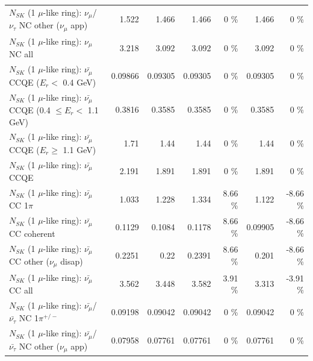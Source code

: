 \begin{table}
\begin{tabular}{| l | r | r | r  r | r  r |}
     $N_{SK}$ (1 $\mu$-like ring): $\nu_\mu$/$\nu_\tau$ NC other ($\nu_\mu$ app) &           1.522 &           1.466 &           1.466 &        0 \%  &           1.466 &        0 \%  \\ 
                                $N_{SK}$ (1 $\mu$-like ring): $\nu_{\mu}$ NC all &           3.218 &           3.092 &           3.092 &        0 \%  &           3.092 &        0 \%  \\ 
\hline
\hline
\hline
          $N_{SK}$ (1 $\mu$-like ring): $\bar{\nu_\mu}$ CCQE ($E_{r} <$ 0.4 GeV) &         0.09866 &         0.09305 &         0.09305 &        0 \%  &         0.09305 &        0 \%  \\ 
 $N_{SK}$ (1 $\mu$-like ring): $\bar{\nu_\mu}$ CCQE (0.4 $\leq E_{r} <$ 1.1 GeV) &          0.3816 &          0.3585 &          0.3585 &        0 \%  &          0.3585 &        0 \%  \\ 
       $N_{SK}$ (1 $\mu$-like ring): $\bar{\nu_\mu}$ CCQE ($E_{r} \geq$ 1.1 GeV) &            1.71 &            1.44 &            1.44 &        0 \%  &            1.44 &        0 \%  \\ 
\hline
                              $N_{SK}$ (1 $\mu$-like ring): $\bar{\nu_\mu}$ CCQE &           2.191 &           1.891 &           1.891 &        0 \%  &           1.891 &        0 \%  \\ 
                         $N_{SK}$ (1 $\mu$-like ring): $\bar{\nu_\mu}$ CC 1$\pi$ &           1.033 &           1.228 &           1.334 &     8.66 \%  &           1.122 &    -8.66 \%  \\ 
                       $N_{SK}$ (1 $\mu$-like ring): $\bar{\nu_\mu}$ CC coherent &          0.1129 &          0.1084 &          0.1178 &     8.66 \%  &         0.09905 &    -8.66 \%  \\ 
        $N_{SK}$ (1 $\mu$-like ring): $\bar{\nu_\mu}$ CC other ($\nu_\mu$ disap) &          0.2251 &            0.22 &          0.2391 &     8.66 \%  &           0.201 &    -8.66 \%  \\ 
                          $N_{SK}$ (1 $\mu$-like ring): $\bar{\nu_{\mu}}$ CC all &           3.562 &           3.448 &           3.582 &     3.91 \%  &           3.313 &    -3.91 \%  \\ 
\hline
  $N_{SK}$ (1 $\mu$-like ring): $\bar{\nu_\mu}$/$\bar{\nu_\tau}$ NC 1$\pi^{+/-}$ &         0.09198 &         0.09042 &         0.09042 &        0 \%  &         0.09042 &        0 \%  \\ 
$N_{SK}$ (1 $\mu$-like ring): $\bar{\nu_\mu}$/$\bar{\nu_\tau}$ NC other ($\nu_\mu$ app) &         0.07958 &         0.07761 &         0.07761 &        0 \%  &         0.07761 &        0 \%  \\ 

\end{tabular}
\end{table}
